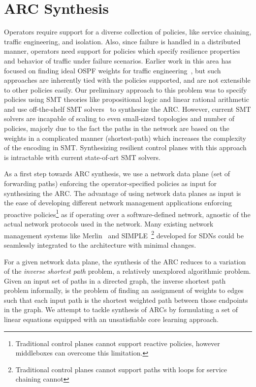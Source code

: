 \section{ARC Synthesis}
Operators require support for a diverse collection of policies, 
like service chaining, traffic engineering, and isolation. Also,
since failure is handled in a distributed manner, operators need 
support for policies which specify resilience properties and behavior
of traffic under failure scenarios. 
Earlier 
work in this area has focused on finding ideal OSPF weights for 
traffic engineering~\cite{te-ospf}, but such approaches are 
inherently tied with the policies supported, and are not extensible 
to other policies easily. Our preliminary approach to this problem was
to specify policies using SMT theories like propositional logic and 
linear rational arithmetic and use off-the-shelf SMT solvers~\cite{z3} 
to synthesize the ARC. However, current SMT solvers are incapable of 
scaling to even small-sized topologies and number of policies, majorly
due to the fact the paths in the network are based on the weights in a 
complicated manner (shortest-path) which increases the complexity of the
encoding in SMT. Synthesizing resilient control planes with this 
approach is intractable with current state-of-art SMT solvers.

As a first step towards ARC synthesis, 
we use a network data plane (set of forwarding paths)
enforcing the operator-specified policies 
as input for synthesizing the ARC. The  
advantage of using network data planes as 
input is the ease of developing
different network management applications 
enforcing proactive policies\footnote{
Traditional control planes cannot support reactive policies, however
middleboxes can overcome this limitation.} 
as if operating over a software-defined
network, agnostic of the actual network protocols used in the network. 
Many existing network management systems like Merlin~\cite{merlin} 
and SIMPLE~\cite{simple}\footnote{
Traditional control planes cannot support 
paths with loops for service chaining cannot} developed for SDNs could be seamlessly
integrated to the architecture with minimal changes.  

For a given network data plane, the synthesis of the ARC reduces to a
variation of the {\em inverse shortest path} problem, a relatively 
unexplored algorithmic problem. 
Given an input set of paths in a directed graph, the inverse shortest path problem 
informally, is the problem of finding an assignment of weights to edges 
such that each input path is the shortest weighted path between those endpoints in 
the graph. We attempt to tackle synthesis of ARCs by formulating a set of linear
equations  equipped with an unsatisfiable core learning approach. 

